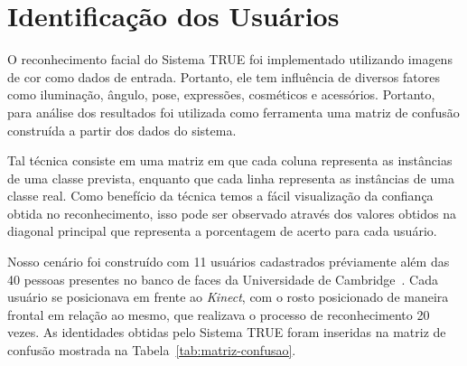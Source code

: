 \section{Identificação dos Usuários}
	 
	O reconhecimento facial do Sistema TRUE foi implementado utilizando imagens de cor como dados de entrada. Portanto, ele tem influência de diversos fatores como iluminação, ângulo, pose, expressões, cosméticos e acessórios. Portanto, para análise dos resultados foi utilizada como ferramenta uma matriz de confusão construída a partir dos dados do sistema.

	Tal técnica consiste em uma matriz em que cada coluna representa as instâncias de uma classe prevista, enquanto que cada linha representa as instâncias de uma classe real. Como benefício da técnica temos a fácil visualização da confiança obtida no reconhecimento, isso pode ser observado através dos valores obtidos na diagonal principal que representa a porcentagem de acerto para cada usuário.

	Nosso cenário foi construído com 11 usuários cadastrados préviamente além das 40 pessoas presentes no banco de faces da Universidade de Cambridge~\cite{cambridgeFaceDb}. Cada usuário se posicionava em frente ao \textit{Kinect}, com o rosto posicionado de maneira frontal em relação ao mesmo, que realizava o processo de reconhecimento 20 vezes. As identidades obtidas pelo Sistema TRUE foram inseridas na matriz de confusão mostrada na Tabela~\ref{tab:matriz-confusao}.
	
